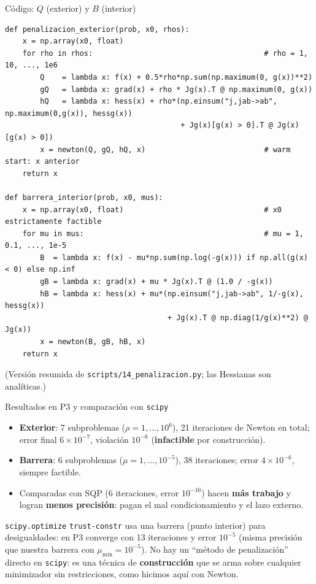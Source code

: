 \documentclass[aspectratio=169]{beamer}
\begin{document}
\begin{frame}[fragile]{Código: $Q$ (exterior) y $B$ (interior)}
\begin{lstlisting}[basicstyle=\ttfamily\fontsize{7}{8.2}\selectfont,breaklines=false]
def penalizacion_exterior(prob, x0, rhos):
    x = np.array(x0, float)
    for rho in rhos:                                       # rho = 1, 10, ..., 1e6
        Q    = lambda x: f(x) + 0.5*rho*np.sum(np.maximum(0, g(x))**2)
        gQ   = lambda x: grad(x) + rho * Jg(x).T @ np.maximum(0, g(x))
        hQ   = lambda x: hess(x) + rho*(np.einsum("j,jab->ab", np.maximum(0,g(x)), hessg(x))
                                        + Jg(x)[g(x) > 0].T @ Jg(x)[g(x) > 0])
        x = newton(Q, gQ, hQ, x)                           # warm start: x anterior
    return x

def barrera_interior(prob, x0, mus):
    x = np.array(x0, float)                                # x0 estrictamente factible
    for mu in mus:                                         # mu = 1, 0.1, ..., 1e-5
        B  = lambda x: f(x) - mu*np.sum(np.log(-g(x))) if np.all(g(x) < 0) else np.inf
        gB = lambda x: grad(x) + mu * Jg(x).T @ (1.0 / -g(x))
        hB = lambda x: hess(x) + mu*(np.einsum("j,jab->ab", 1/-g(x), hessg(x))
                                     + Jg(x).T @ np.diag(1/g(x)**2) @ Jg(x))
        x = newton(B, gB, hB, x)
    return x
\end{lstlisting}
  \small (Versión resumida de \texttt{scripts/14\_penalizacion.py}; las Hessianas son analíticas.)
\end{frame}

\begin{frame}{Resultados en P3 y comparación con \texttt{scipy}}
  \small
  \begin{itemize}
    \item \textbf{Exterior}: 7 subproblemas ($\rho=1,\dots,10^6$), 21 iteraciones de Newton en total; error final $6\!\times\!10^{-7}$, violación $10^{-6}$ (\textbf{infactible} por construcción).
    \item \textbf{Barrera}: 6 subproblemas ($\mu=1,\dots,10^{-5}$), 38 iteraciones; error $4\!\times\!10^{-6}$, siempre factible.
    \item Comparadas con SQP (6 iteraciones, error $10^{-16}$) hacen \textbf{más trabajo} y logran \textbf{menos precisión}: pagan el mal condicionamiento y el lazo externo.
  \end{itemize}
  \begin{alertblock}{\texttt{scipy.optimize}}
    \texttt{trust-constr} usa una barrera (punto interior) para desigualdades: en P3 converge con 13 iteraciones y error $10^{-5}$ (misma precisión que nuestra barrera con $\mu_{\min}=10^{-5}$). No hay un ``método de penalización'' directo en \texttt{scipy}: es una técnica de \textbf{construcción} que se arma sobre cualquier minimizador sin restricciones, como hicimos aquí con Newton.
  \end{alertblock}
\end{frame}
\end{document}
